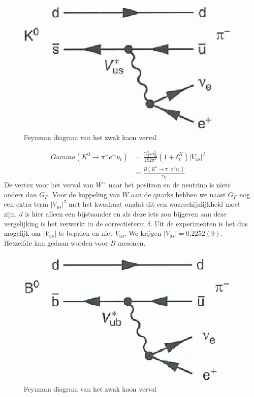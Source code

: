\documentclass[../main.tex]{subfiles}
\begin{document}
\begin{figure}[h]
    \centering
    \includegraphics[width=0.5\linewidth]{meson_mixing_and_oscillations/zwak_s_verval.png}
    \caption{Feynman diagram van het zwak kaon verval}%
    \label{fig:meson_mixing_and_oscillations/zwak_s_verval}
\end{figure}

\begin{equation}
    \begin{aligned}
        \label{eq:kaon_zwak_verval}
        Gamma\left(K^{0} \rightarrow \pi^{-} e^{+} \nu_{e}\right) &=\frac{G_{F}^{2} m_{K}^{5}}{192 \pi^{3}}\left(1+\delta_{e}^{K}\right)\left|V_{u s}\right|^{2} \\
                                                                  &=\frac{B\left(K^{0} \rightarrow \pi^{-} e^{+} \nu_{e}\right)}{\tau_{K}}
    \end{aligned}
\end{equation}
De vertex voor het verval van $W^+$ naar het positron en de neutrino is niets anders dan $G_F$. Voor de koppeling van $W$ aan de quarks hebben we naast $G_F$ nog een extra term $|V_{us}|^2$ met het kwadraat omdat dit een waarschijnlijkheid moet zijn. $d$ is hier alleen een bijstaander en als deze iets zou bijgeven aan deze vergelijking is het verwerkt in de correctieterm $\delta$. Uit de experimenten is het dus mogelijk om $|V_{us}|$ te bepalen en niet $V_{us}$. We krijgen $\left|V_{us}\right|=0.2252(9)$.\\
Hetzelfde kan gedaan worden voor $B$ mesonen.

\begin{figure}[h]
    \centering
    \includegraphics[width=0.5\linewidth]{meson_mixing_and_oscillations/zwak_b_verval.png}
    \caption{Feynman diagram van het zwak kaon verval}%
    \label{fig:meson_mixing_and_oscillations/zwak_b_verval}
\end{figure}
\end{document}
